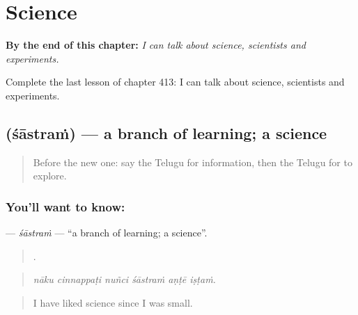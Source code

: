 
\chapter{Science}
\label{ch:te-science}

\begin{chapteropening}
\textbf{By the end of this chapter:} \emph{I can talk about science, scientists and experiments.}

Complete the last lesson of chapter 413: I can talk about science, scientists and experiments.
\end{chapteropening}

\section[\texorpdfstring{\te{శాస్త్రం} (śāstraṁ)}{శాస్త్రం (śāstraṁ)}]{ (śāstraṁ) — a branch of learning; a science}

\label{lesson:TE-C413-sastram}



\begin{quote}
Before the new one: say the Telugu for information, then the Telugu for to explore.
\end{quote}

\subsection*{You'll want to know: }
\textbf{} — \emph{śāstraṁ} — \textquotedblleft{}a branch of learning; a science\textquotedblright{}.

\begin{quote}
     .
\end{quote}

\begin{quote}
\emph{nāku cinnappaṭi nuñci śāstraṁ aṇṭē iṣṭaṁ.}
\end{quote}

\begin{quote}
I have liked science since I was small.
\end{quote}

